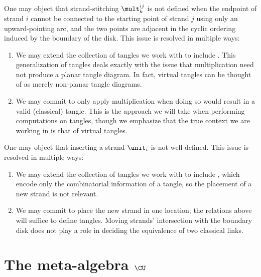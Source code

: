 \begin{remark}\label{rem:virtual_caveat_mult}
One may object that strand-stitching $\mult^{ij}_k$ is not defined when
the endpoint of strand $i$ cannot be connected to the starting point of strand
$j$ using only an upward-pointing arc, and the two points are adjacent in the
cyclic ordering induced by the boundary of the disk. This issue is resolved in
multiple ways:
\begin{enumerate}
        \item We may extend the collection of tangles we work with to include
                . This generalization of tangles
                deals exactly with the issue that multiplication need
                not produce a planar tangle diagram. In fact, virtual
                tangles can be thought of as merely non-planar tangle
                diagrams.
        \item We may commit to only apply multiplication when doing so would
                result in a valid (classical) tangle. This is the
                approach we will take when performing computations on
                tangles, though we emphasize that the true context we are
                working in is that of virtual tangles.
\end{enumerate}
\end{remark}

\begin{remark}\label{rem:virtual_caveat_unit}
One may object that inserting a strand $\unit_i$ is not well-defined. This issue
is resolved in multiple ways:
\begin{enumerate}
        \item We may extend the collection of tangles we work with to include
                , which encode only the combinatorial
                information of a tangle, so the placement of a new strand is not
                relevant.
        \item We may commit to place the new strand in one location; the
                relations above will suffice to define tangles. Moving strands'
                intersection with the boundary disk does not play a role in
                deciding the equivalence of two classical links.
\end{enumerate}
\end{remark}

\section{The meta-algebra $\CU$}\label{sec:algebraic-definitions}


